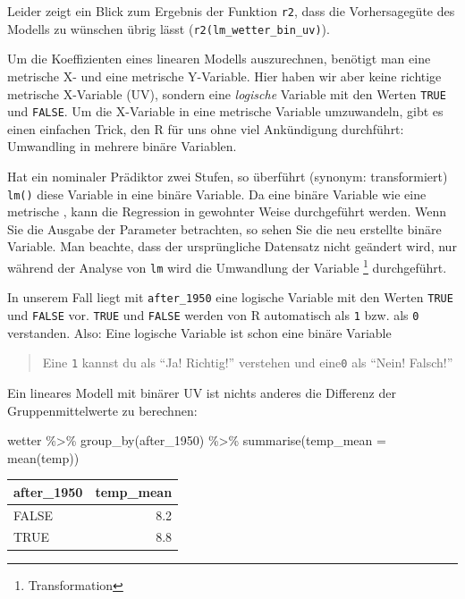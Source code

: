 \documentclass[
  letterpaper,
]{scrbook}
\newenvironment{Shaded}{\begin{snugshade}}{\end{snugshade}}
\newcommand{\AttributeTok}[1]{\textcolor[rgb]{0.40,0.45,0.13}{#1}}
\newcommand{\FunctionTok}[1]{\textcolor[rgb]{0.28,0.35,0.67}{#1}}
\newcommand{\NormalTok}[1]{\textcolor[rgb]{0.00,0.23,0.31}{#1}}
\newcommand{\SpecialCharTok}[1]{\textcolor[rgb]{0.37,0.37,0.37}{#1}}
\theoremstyle{definition}
\theoremstyle{definition}
\theoremstyle{definition}
\theoremstyle{remark}
\begin{document}
Leider zeigt ein Blick zum Ergebnis der Funktion \texttt{r2}, dass die
Vorhersagegüte des Modells zu wünschen übrig lässt
(\texttt{r2(lm\_wetter\_bin\_uv)}).

Um die Koeffizienten eines linearen Modells auszurechnen, benötigt man
eine metrische X- und eine metrische Y-Variable. Hier haben wir aber
keine richtige metrische X-Variable (UV), sondern eine \emph{logische}
Variable mit den Werten \texttt{TRUE} und \texttt{FALSE}. Um die
X-Variable in eine metrische Variable umzuwandeln, gibt es einen
einfachen Trick, den R für uns ohne viel Ankündigung durchführt:
Umwandling in mehrere binäre Variablen.

Hat ein nominaler Prädiktor zwei Stufen, so überführt (synonym:
transformiert) \texttt{lm()} diese Variable in eine binäre Variable. Da
eine binäre Variable wie eine metrische , kann die Regression in
gewohnter Weise durchgeführt werden. Wenn Sie die Ausgabe der Parameter
betrachten, so sehen Sie die neu erstellte binäre Variable. Man beachte,
dass der ursprüngliche Datensatz nicht geändert wird, nur während der
Analyse von \texttt{lm} wird die Umwandlung der Variable \footnote{Transformation}
durchgeführt.

In unserem Fall liegt mit \texttt{after\_1950} eine logische Variable
mit den Werten \texttt{TRUE} und \texttt{FALSE} vor. \texttt{TRUE} und
\texttt{FALSE} werden von R automatisch als \texttt{1} bzw. als
\texttt{0} verstanden. Also: Eine logische Variable ist schon eine
binäre Variable

\begin{quote}
{} Eine \texttt{1} kannst du als \enquote{Ja! Richtig!}
verstehen und eine\texttt{0} als \enquote{Nein! Falsch!}
\end{quote}

Ein lineares Modell mit binärer UV ist nichts anderes die Differenz der
Gruppenmittelwerte zu berechnen:

\begin{Shaded}
\begin{Highlighting}[]
\NormalTok{wetter }\SpecialCharTok{\%\textgreater{}\%} 
  \FunctionTok{group\_by}\NormalTok{(after\_1950) }\SpecialCharTok{\%\textgreater{}\%} 
  \FunctionTok{summarise}\NormalTok{(}\AttributeTok{temp\_mean =} \FunctionTok{mean}\NormalTok{(temp))}
\end{Highlighting}
\end{Shaded}

\begin{longtable}[]{@{}lr@{}}
\toprule\noalign{}
after\_1950 & temp\_mean \\
\midrule\noalign{}
\endhead
\bottomrule\noalign{}
\endlastfoot
FALSE & 8.2 \\
TRUE & 8.8 \\
\end{longtable}
\end{document}
